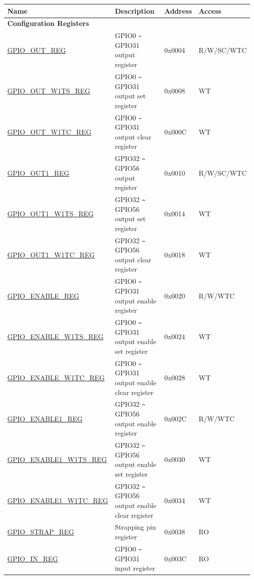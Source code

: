 \begin{longtable}{ | p{5.8cm} | p{7.2cm} | p{1.3cm} | p{2.2cm} | }
\hline\rowcolor{lightgray}
\textbf{Name} & \textbf{Description} &  \textbf{Address} & \textbf{Access} \\ \hline
\endhead
\multicolumn{4}{|l|}{\textbf{Configuration Registers}} \\ \hline
\hyperref[regdesc:GPIOOUTREG]{GPIO\_OUT\_REG} & GPIO0 \verb+~+ GPIO31 output register & 0x0004 & R/W/SC/WTC \\ \hline
\hyperref[regdesc:GPIOOUTW1TSREG]{GPIO\_OUT\_W1TS\_REG} & GPIO0 \verb+~+ GPIO31 output set register & 0x0008 & WT \\ \hline
\hyperref[regdesc:GPIOOUTW1TCREG]{GPIO\_OUT\_W1TC\_REG} & GPIO0 \verb+~+ GPIO31 output clear register & 0x000C & WT \\ \hline
\hyperref[regdesc:GPIOOUT1REG]{GPIO\_OUT1\_REG} & GPIO32 \verb+~+ GPIO56 output register & 0x0010 & R/W/SC/WTC \\ \hline
\hyperref[regdesc:GPIOOUT1W1TSREG]{GPIO\_OUT1\_W1TS\_REG} & GPIO32 \verb+~+ GPIO56 output set register & 0x0014 & WT \\ \hline
\hyperref[regdesc:GPIOOUT1W1TCREG]{GPIO\_OUT1\_W1TC\_REG} & GPIO32 \verb+~+ GPIO56 output clear register & 0x0018 & WT \\ \hline
\hyperref[regdesc:GPIOENABLEREG]{GPIO\_ENABLE\_REG} & GPIO0 \verb+~+ GPIO31 output enable register & 0x0020 & R/W/WTC \\ \hline
\hyperref[regdesc:GPIOENABLEW1TSREG]{GPIO\_ENABLE\_W1TS\_REG} & GPIO0 \verb+~+ GPIO31 output enable set register & 0x0024 & WT \\ \hline
\hyperref[regdesc:GPIOENABLEW1TCREG]{GPIO\_ENABLE\_W1TC\_REG} & GPIO0 \verb+~+ GPIO31 output enable clear register & 0x0028 & WT \\ \hline
\hyperref[regdesc:GPIOENABLE1REG]{GPIO\_ENABLE1\_REG} & GPIO32 \verb+~+ GPIO56 output enable register & 0x002C & R/W/WTC \\ \hline
\hyperref[regdesc:GPIOENABLE1W1TSREG]{GPIO\_ENABLE1\_W1TS\_REG} & GPIO32 \verb+~+ GPIO56 output enable set register & 0x0030 & WT \\ \hline
\hyperref[regdesc:GPIOENABLE1W1TCREG]{GPIO\_ENABLE1\_W1TC\_REG} & GPIO32 \verb+~+ GPIO56 output enable clear register & 0x0034 & WT \\ \hline
\hyperref[regdesc:GPIOSTRAPREG]{GPIO\_STRAP\_REG} & Strapping pin register & 0x0038 & RO \\ \hline
\hyperref[regdesc:GPIOINREG]{GPIO\_IN\_REG} & GPIO0 \verb+~+ GPIO31 input register & 0x003C & RO \\ \hline

\end{longtable}
